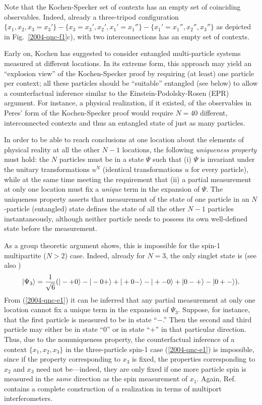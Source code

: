 
Note that the Kochen-Specker set of contexts has an empty set of coinciding observables.
Indeed, already a three-tripod configuration
$\{x_1,x_2,x_3=x_3'\}-\{x_3=x_3',x_2',x_1'=x_1''\}-\{x_1'=x_1'',x_2'',x_3''\}$
as depicted in Fig.~\ref{2004-qnc-f1}c),
with two interconnections has an empty set of contexts.

Early on, Kochen \cite{hey-red} has suggested
to consider entangled multi-particle systems measured at different locations.
In its extreme form, this approach may yield an ``explosion view'' of the
Kochen-Specker proof
by requiring (at least) one particle per context;
all these particles should be ``suitable'' entangled (see below)
to allow a counterfactual inference
similar to the Einstein-Podolsky-Rosen (EPR) argument.
For
instance, a physical realization,
if it existed, of the observables in Peres' form
of the Kochen-Specker proof \cite{peres,svozil-tkadlec}
would require $N=40$ different, interconnected contexts and thus
an entangled state of just as many particles.

In order to be able to reach conclusions at
one location about the elements of physical reality \cite{epr}
at all the other $N-1$ locations,
the following {\em uniqueness property} must hold:
the $N$ particles must be in a state  $\Psi$
such that
(i) $\Psi$ is invariant under the unitary transformations $u^N$
(identical transformations $u$ for every particle),
while at the same time meeting the requirement that
(ii) a partial measurement at only one location must
fix a {\em unique} term in the expansion of $\Psi$.
The uniqueness property asserts that measurement of the state of one particle in an $N$-particle
(entangled) state defines
the state of  all the other $N-1$ particles instantaneously,
although neither particle needs to possess its own well-defined state before the measurement.

As a group theoretic argument \cite{2004-kasper-svo} shows,
this is impossible
for the spin-1 multipartite ($N>2$) case.
Indeed, already for $N=3$, the only singlet state  is (see also \cite{kok-02})
\begin{equation}
\vert \Psi_3 \rangle
= {1\over \sqrt{6}}(
\vert - + 0\rangle
-
\vert - 0 +\rangle
+
\vert + 0 - \rangle
-
\vert + - 0\rangle
+
\vert 0 - + \rangle
-
\vert 0 + - \rangle
).
\label{2004-qnc-e1}
\end{equation}
From (\ref{2004-qnc-e1}) it can be inferred that
any partial measurement at only one location cannot
fix a  unique term in the expansion of $\Psi_3$.
Suppose, for instance, that the first particle is measured to be in state
``$-$.'' Then the second and third particle may either be in state ``$0$'' or in state ``$+$''
in that particular direction.
Thus, due to the nonuniqueness property, the counterfactual inference of a context $\{x_1,x_2,x_3\}$ in the three-particle spin-1
case (\ref{2004-qnc-e1}) is impossible,
since if the property corresponding to $x_3$ is fixed,
the properties corresponding to $x_2$ and $x_3$ need not be---indeed,
they are only fixed if one more particle spin is measured in the {\em same}
direction as the spin measurement of $x_1$.
Again, Ref.~\cite{svozil-2004-analog} contains a complete construction of a
realization in terms of multiport interferometers.

